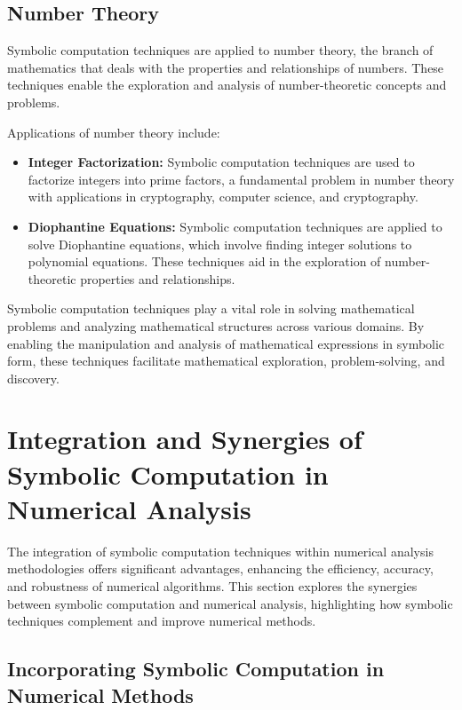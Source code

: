 \subsection{Number Theory}

Symbolic computation techniques are applied to number theory, the branch of mathematics that deals with the properties and relationships of numbers. These techniques enable the exploration and analysis of number-theoretic concepts and problems.

Applications of number theory include:
%
\begin{itemize}
  \setlength{\itemsep}{0.0em}
  \item \textbf{Integer Factorization:} Symbolic computation techniques are used to factorize integers into prime factors, a fundamental problem in number theory with applications in cryptography, computer science, and cryptography.
  \item \textbf{Diophantine Equations:} Symbolic computation techniques are applied to solve Diophantine equations, which involve finding integer solutions to polynomial equations. These techniques aid in the exploration of number-theoretic properties and relationships.
\end{itemize}

Symbolic computation techniques play a vital role in solving mathematical problems and analyzing mathematical structures across various domains. By enabling the manipulation and analysis of mathematical expressions in symbolic form, these techniques facilitate mathematical exploration, problem-solving, and discovery.


\section{Integration and Synergies of Symbolic Computation in Numerical Analysis}
\label{chap2:sec:integration}

The integration of symbolic computation techniques within numerical analysis methodologies offers significant advantages, enhancing the efficiency, accuracy, and robustness of numerical algorithms. This section explores the synergies between symbolic computation and numerical analysis, highlighting how symbolic techniques complement and improve numerical methods.

\subsection{Incorporating Symbolic Computation in Numerical Methods}


